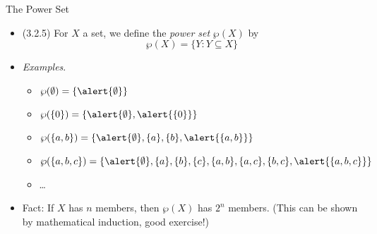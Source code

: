 \documentclass[../slides.tex]{subfiles}
\begin{document}
\begin{frame}{The Power Set}

	\begin{itemize}
	
		\item (3.2.5) For $X$ a set, we define the \emph{power set} $\wp(X)$ by \[\wp(X)=\{Y:Y\subseteq X\}\]
		
		\item \emph{Examples}.
		
			\begin{itemize}
			
				\item $\wp(\emptyset)=\{\alert{\emptyset}\}$
				
				\item $\wp(\{0\})=\{\alert{\emptyset}, \alert{\{0\}}\}$
			
				\item $\wp(\{a,b\})=\{\alert{\emptyset}, \{a\}, \{b\},\alert{\{a,b\}}\}$
				\item $\wp(\{a,b,c\})=\{\alert{\emptyset}, \{a\}, \{b\}, \{c\}, \{a,b\}, \{a,c\}, \{b,c\}, \alert{\{a,b,c\}}\}$
				
				\item \dots
			
			\end{itemize}
			
		\item Fact: If $X$ has $n$ members, then $\wp(X)$ has $2^n$ members. (This can be shown by mathematical induction, good exercise!)
		

	\end{itemize}

\end{frame}
\end{document}
